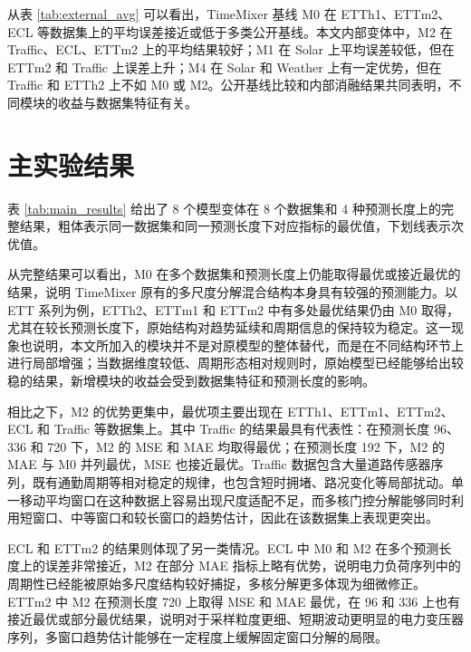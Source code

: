 \begingroup
\setlength{\floatsep}{6pt plus 1pt minus 1pt}
\setlength{\textfloatsep}{6pt plus 1pt minus 1pt}
\setlength{\intextsep}{6pt plus 1pt minus 1pt}
\setlength{\abovecaptionskip}{2pt}
\setlength{\belowcaptionskip}{2pt}
\renewcommand{\arraystretch}{0.92}

\endgroup
\FloatBarrier

从表 \ref{tab:external_avg} 可以看出，TimeMixer 基线 M0 在 ETTh1、ETTm2、ECL 等数据集上的平均误差接近或低于多类公开基线。本文内部变体中，M2 在 Traffic、ECL、ETTm2 上的平均结果较好；M1 在 Solar 上平均误差较低，但在 ETTm2 和 Traffic 上误差上升；M4 在 Solar 和 Weather 上有一定优势，但在 Traffic 和 ETTh2 上不如 M0 或 M2。公开基线比较和内部消融结果共同表明，不同模块的收益与数据集特征有关。

\section{主实验结果}

表 \ref{tab:main_results} 给出了 8 个模型变体在 8 个数据集和 4 种预测长度上的完整结果，粗体表示同一数据集和同一预测长度下对应指标的最优值，下划线表示次优值。



从完整结果可以看出，M0 在多个数据集和预测长度上仍能取得最优或接近最优的结果，说明 TimeMixer 原有的多尺度分解混合结构本身具有较强的预测能力。以 ETT 系列为例，ETTh2、ETTm1 和 ETTm2 中有多处最优结果仍由 M0 取得，尤其在较长预测长度下，原始结构对趋势延续和周期信息的保持较为稳定。这一现象也说明，本文所加入的模块并不是对原模型的整体替代，而是在不同结构环节上进行局部增强；当数据维度较低、周期形态相对规则时，原始模型已经能够给出较稳的结果，新增模块的收益会受到数据集特征和预测长度的影响。

相比之下，M2 的优势更集中，最优项主要出现在 ETTh1、ETTm1、ETTm2、ECL 和 Traffic 等数据集上。其中 Traffic 的结果最具有代表性：在预测长度 96、336 和 720 下，M2 的 MSE 和 MAE 均取得最优；在预测长度 192 下，M2 的 MAE 与 M0 并列最优，MSE 也接近最优。Traffic 数据包含大量道路传感器序列，既有通勤周期等相对稳定的规律，也包含短时拥堵、路况变化等局部扰动。单一移动平均窗口在这种数据上容易出现尺度适配不足，而多核门控分解能够同时利用短窗口、中等窗口和较长窗口的趋势估计，因此在该数据集上表现更突出。

ECL 和 ETTm2 的结果则体现了另一类情况。ECL 中 M0 和 M2 在多个预测长度上的误差非常接近，M2 在部分 MAE 指标上略有优势，说明电力负荷序列中的周期性已经能被原始多尺度结构较好捕捉，多核分解更多体现为细微修正。ETTm2 中 M2 在预测长度 720 上取得 MSE 和 MAE 最优，在 96 和 336 上也有接近最优或部分最优结果，说明对于采样粒度更细、短期波动更明显的电力变压器序列，多窗口趋势估计能够在一定程度上缓解固定窗口分解的局限。


